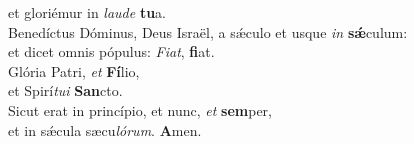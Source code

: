 \evenverse et gloriémur in \textit{lau}\textit{de} \textbf{tu}a.\\
\oddverse Benedíctus Dóminus, Deus Israël, a sǽculo et usque \textit{in} \textbf{sǽ}culum:~\*\\
\oddverse et dicet omnis pópulus: \textit{Fi}\textit{at}, \textbf{fi}at.\\
\evenverse Glória Patri, \textit{et} \textbf{Fí}lio,~\*\\
\evenverse et Spirí\textit{tu}\textit{i} \textbf{San}cto.\\
\oddverse Sicut erat in princípio, et nunc, \textit{et} \textbf{sem}per,~\*\\
\oddverse et in sǽcula sæcu\textit{ló}\textit{rum}. \textbf{A}men.\\
